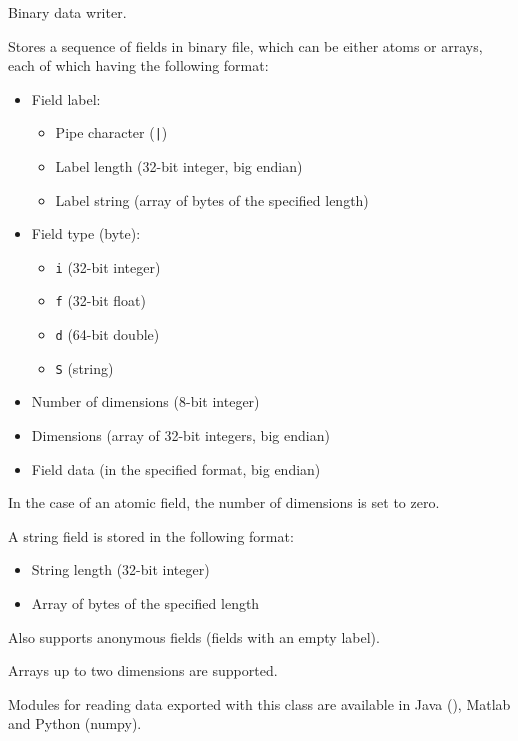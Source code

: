 
Binary data writer.

Stores a sequence of fields in binary file, which can be either atoms or arrays,
each of which having the following format:
\begin{itemize}
   \item Field label:
      \begin{itemize}
         \item Pipe character (\texttt{|})
         \item Label length (32-bit integer, big endian)
         \item Label string (array of bytes of the specified length)
      \end{itemize}
   
   \item Field type (byte):
      \begin{itemize}
         \item \texttt{i} (32-bit integer)
         \item \texttt{f} (32-bit float)
         \item \texttt{d} (64-bit double)
         \item \texttt{S} (string)
      \end{itemize}
   
   \item Number of dimensions (8-bit integer)
   \item Dimensions (array of 32-bit integers, big endian)
   \item Field data (in the specified format, big endian)
\end{itemize}

In the case of an atomic field, the number of dimensions is set to zero.

A string field is stored in the following format:
\begin{itemize}
   \item String length (32-bit integer)
   \item Array of bytes of the specified length
\end{itemize}

Also supports anonymous fields (fields with an empty label).

Arrays up to two dimensions are supported.

Modules for reading data exported with this class are available in Java (), Matlab and Python (numpy).

\begin{comment}
Provide links for the import modules.
\end{comment}

